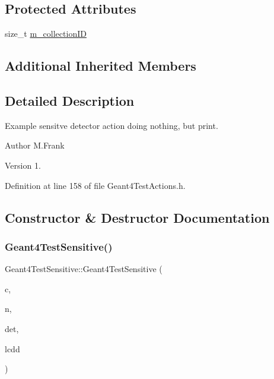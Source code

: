 \subsection*{Protected Attributes}
\begin{DoxyCompactItemize}
\item 
size\+\_\+t \hyperlink{class_d_d4hep_1_1_simulation_1_1_test_1_1_geant4_test_sensitive_a2b6048929e3f19fbe4e2f9eb4fe8e77a}{m\+\_\+collection\+ID}
\end{DoxyCompactItemize}
\subsection*{Additional Inherited Members}


\subsection{Detailed Description}
Example sensitve detector action doing nothing, but print. 

\begin{DoxyAuthor}{Author}
M.\+Frank 
\end{DoxyAuthor}
\begin{DoxyVersion}{Version}
1. 
\end{DoxyVersion}


Definition at line 158 of file Geant4\+Test\+Actions.\+h.



\subsection{Constructor \& Destructor Documentation}
\hypertarget{class_d_d4hep_1_1_simulation_1_1_test_1_1_geant4_test_sensitive_ad25fb0c90df85ec1ad12ab7dc4311fcc}{}\label{class_d_d4hep_1_1_simulation_1_1_test_1_1_geant4_test_sensitive_ad25fb0c90df85ec1ad12ab7dc4311fcc} 
\subsubsection{\texorpdfstring{Geant4\+Test\+Sensitive()}{Geant4TestSensitive()}}
{\footnotesize\ttfamily Geant4\+Test\+Sensitive\+::\+Geant4\+Test\+Sensitive (\begin{DoxyParamCaption}\item[{\hyperlink{class_d_d4hep_1_1_simulation_1_1_geant4_context}{Geant4\+Context} $\ast$}]{c,  }\item[{const std\+::string \&}]{n,  }\item[{\hyperlink{class_d_d4hep_1_1_simulation_1_1_geant4_sensitive_a1cb1af5fb1194be1e1c1137f1e54272b}{Det\+Element}}]{det,  }\item[{\hyperlink{class_d_d4hep_1_1_simulation_1_1_geant4_sensitive_a3373caa6917867ca7c871df20fb467c8}{L\+C\+DD} \&}]{lcdd }\end{DoxyParamCaption})}



